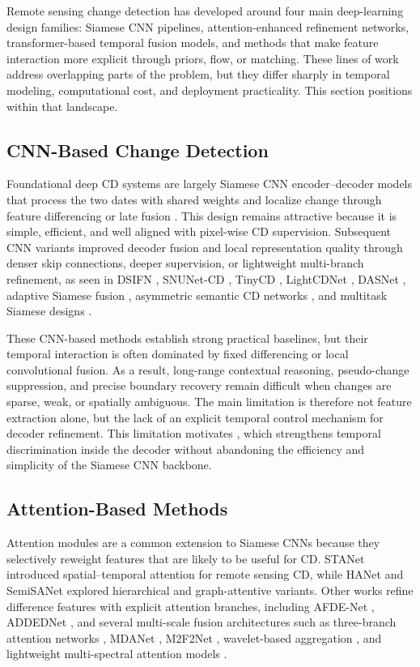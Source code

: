 Remote sensing change detection has developed around four main deep-learning design families: Siamese CNN pipelines, attention-enhanced refinement networks, transformer-based temporal fusion models, and methods that make feature interaction more explicit through priors, flow, or matching. These lines of work address overlapping parts of the problem, but they differ sharply in temporal modeling, computational cost, and deployment practicality. This section positions \cosa{} within that landscape.

\subsection{CNN-Based Change Detection}
Foundational deep CD systems are largely Siamese CNN encoder--decoder models that process the two dates with shared weights and localize change through feature differencing or late fusion \cite{daudt2018fully,ronneberger2015unet,hongruixuan2019}. This design remains attractive because it is simple, efficient, and well aligned with pixel-wise CD supervision. Subsequent CNN variants improved decoder fusion and local representation quality through denser skip connections, deeper supervision, or lightweight multi-branch refinement, as seen in DSIFN \cite{zhang2020deeply}, SNUNet-CD \cite{fang2021snunetcd}, TinyCD \cite{codegoni2022tinycd}, LightCDNet \cite{10214556}, DASNet \cite{jie2020}, adaptive Siamese fusion \cite{yunzuo2025}, asymmetric semantic CD networks \cite{kunping2022}, and multitask Siamese designs \cite{xibing2025}.

These CNN-based methods establish strong practical baselines, but their temporal interaction is often dominated by fixed differencing or local convolutional fusion. As a result, long-range contextual reasoning, pseudo-change suppression, and precise boundary recovery remain difficult when changes are sparse, weak, or spatially ambiguous. The main limitation is therefore not feature extraction alone, but the lack of an explicit temporal control mechanism for decoder refinement. This limitation motivates \cosa{}, which strengthens temporal discrimination inside the decoder without abandoning the efficiency and simplicity of the Siamese CNN backbone.

\subsection{Attention-Based Methods}
Attention modules are a common extension to Siamese CNNs because they selectively reweight features that are likely to be useful for CD. STANet \cite{chen2020stanet} introduced spatial--temporal attention for remote sensing CD, while HANet \cite{10093022} and SemiSANet \cite{chengzhen2022} explored hierarchical and graph-attentive variants. Other works refine difference features with explicit attention branches, including AFDE-Net \cite{s2023}, ADDEDNet \cite{junheng2025}, and several multi-scale fusion architectures such as three-branch attention networks \cite{yan2024}, MDANet \cite{shanshan2024}, M2F2Net \cite{binhao2025}, wavelet-based aggregation \cite{jiangwei2024}, and lightweight multi-spectral attention models \cite{layth2025}.

